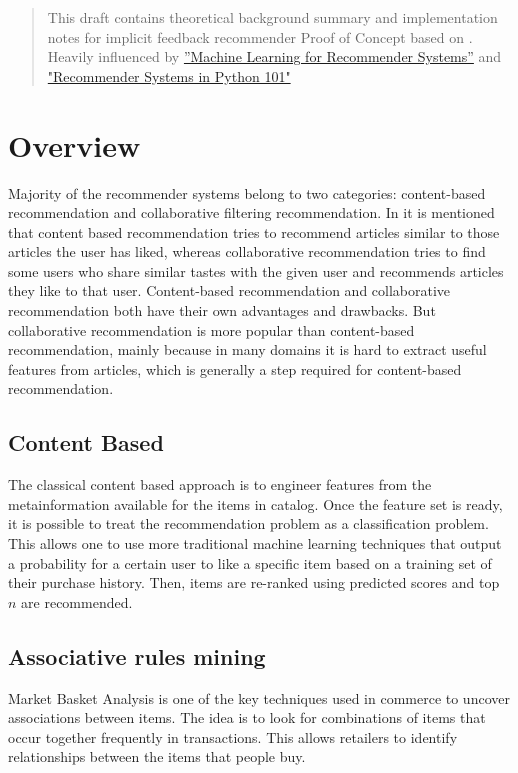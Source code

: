 \documentclass[12pt]{article}
\begin{document}
\maketitle

\begin{abstract}
This draft contains theoretical background summary and implementation notes for implicit feedback recommender Proof of Concept based on \cite{CFIFD}. 
Heavily influenced by \href{https://medium.com/recombee-blog/machine-learning-for-recommender-systems-part-1-algorithms-evaluation-and-cold-start-6f696683d0ed}{''Machine Learning for Recommender Systems''} and  \href{https://www.kaggle.com/gspmoreira/recommender-systems-in-python-101/code}{"Recommender Systems in Python 101"}
\end{abstract}

\section{Overview}
Majority of the recommender systems belong to two categories: content-based recommendation and collaborative filtering recommendation. In \cite{CCR} it is mentioned that content based recommendation tries to recommend articles similar to those articles the user has liked, whereas collaborative recommendation tries to find some users who share similar tastes with the given user and recommends articles they like to that user. Content-based recommendation and collaborative recommendation both have their own advantages and drawbacks. But collaborative recommendation is more popular than content-based recommendation, mainly because in many domains it is hard to extract useful features from articles, which is
generally a step required for content-based recommendation.
\subsection{Content Based}
The classical content based approach is to engineer features from the metainformation available for the items in catalog. Once the feature set is ready, it is possible to treat the recommendation problem as a classification problem. This allows one to use more traditional machine learning techniques that output a probability for a certain user to like a specific item based on a training set of their purchase history. Then, items are re-ranked using predicted scores and top $n$ are recommended.

\subsection{Associative rules mining}
Market Basket Analysis is one of the key techniques used in commerce to uncover associations between items. 
The idea is to look for combinations of items that occur together frequently in transactions. This allows retailers to identify relationships between the items that people buy.
\end{document}
